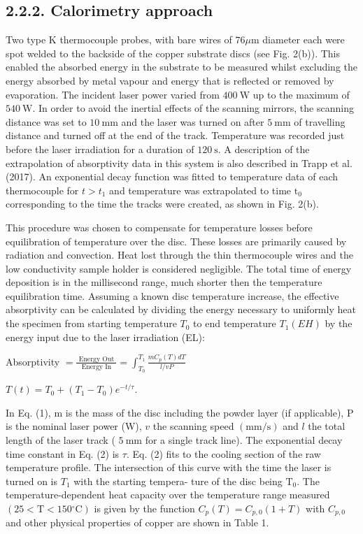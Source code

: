 \documentclass[10pt]{article}
\begin{document}
\subsection*{2.2.2. Calorimetry approach}
Two type $\mathrm{K}$ thermocouple probes, with bare wires of $76 \mu \mathrm{m}$ diameter each were spot welded to the backside of the copper substrate discs (see Fig. 2(b)). This enabled the absorbed energy in the substrate to be measured whilst excluding the energy absorbed by metal vapour and energy that is reflected or removed by evaporation. The incident laser power varied from $400 \mathrm{~W}$ up to the maximum of $540 \mathrm{~W}$. In order to avoid the inertial effects of the scanning mirrors, the scanning distance was set to $10 \mathrm{~mm}$ and the laser was turned on after $5 \mathrm{~mm}$ of travelling distance and turned off at the end of the track. Temperature was recorded just before the laser irradiation for a duration of $120 \mathrm{~s}$. A description of the extrapolation of absorptivity data in this system is also described in Trapp et al. (2017). An exponential decay function was fitted to temperature data of each thermocouple for $t>t_{1}$ and temperature was extrapolated to time $\mathrm{t}_{0}$ corresponding to the time the tracks were created, as shown in Fig. 2(b).

This procedure was chosen to compensate for temperature losses before equilibration of temperature over the disc. These losses are primarily caused by radiation and convection. Heat lost through the thin thermocouple wires and the low conductivity sample holder is considered negligible. The total time of energy deposition is in the millisecond range, much shorter then the temperature equilibration time. Assuming a known disc temperature increase, the effective absorptivity can be calculated by dividing the energy necessary to uniformly heat the specimen from starting temperature $T_{0}$ to end temperature $T_{1}(E H)$ by the energy input due to the laser irradiation (EL):

Absorptivity $=\frac{\text { Energy Out }}{\text { Energy In }}=\int_{T_{0}}^{T_{1}} \frac{m C_{p}(T) d T}{l / v P}$

$T(t)=T_{0}+\left(T_{1}-T_{0}\right) e^{-t / \tau}$.

In Eq. (1), $\mathrm{m}$ is the mass of the disc including the powder layer (if applicable), $\mathrm{P}$ is the nominal laser power (W), $v$ the scanning speed $(\mathrm{mm} / \mathrm{s})$ and $l$ the total length of the laser track ( $5 \mathrm{~mm}$ for a single track line). The exponential decay time constant in Eq. (2) is $\tau$. Eq. (2) fits to the cooling section of the raw temperature profile. The intersection of this curve with the time the laser is turned on is $T_{1}$ with the starting tempera- ture of the disc being $\mathrm{T}_{0}$. The temperature-dependent heat capacity over the temperature range measured $\left(25<\mathrm{T}<150{ }^{\circ} \mathrm{C}\right)$ is given by the function $C_{p}(T)=C_{p, 0}(1+T)$ with $C_{p, 0}$ and other physical properties of copper are shown in Table 1.
\end{document}
